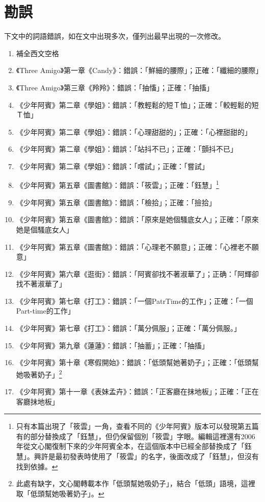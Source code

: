 \chapter*{勘誤}
下文中的詞語錯誤，如在文中出現多次，僅列出最早出現的一次修改。
\begin{enumerate}
\item 補全西文空格
\item 《Three Amigo》第一章《Candy》：錯誤：「鮮細的腰際」；正確：「纖細的腰際」
\item 《Three Amigo》第三章《羚羚》：錯誤：「抽慉」；正確：「抽搐」
\item 《少年阿賓》第二章《學姐》：錯誤：「教輕鬆的短Ｔ恤」；正確：「較輕鬆的短Ｔ恤」
\item 《少年阿賓》第二章《學姐》：錯誤：「心理甜甜的」；正確：「心裡甜甜的」
\item 《少年阿賓》第二章《學姐》：錯誤：「站抖不已」；正確：「顫抖不已」
\item 《少年阿賓》第二章《學姐》：錯誤：「嚐試」；正確：「嘗試」
\item 《少年阿賓》第五章《圖書館》：錯誤：「筱雲」；正確：「鈺慧」\footnote{只有本篇出現了「筱雲」一角，查看不同的《少年阿賓》版本可以發現第五篇有的部分替換成了「鈺慧」，但仍保留個別「筱雲」字眼。編輯這裡還有2006年從文心閣復制下來的少年阿賓全本，在這個版本中已經全部替換成了「鈺慧」。興許是最初發表時使用了「筱雲」的名字，後面改成了「鈺慧」，但沒有找到依據。}
\item 《少年阿賓》第五章《圖書館》：錯誤：「檢拾」；正確：「撿拾」
\item 《少年阿賓》第五章《圖書館》：錯誤：「原來是她個騷底女人」；正確：「原來她是個騷底女人」
\item 《少年阿賓》第五章《圖書館》：錯誤：「心理老不願意」；正確：「心裡老不願意」
\item 《少年阿賓》第六章《逛街》：錯誤：「阿賓卻找不著淑華了」；正确：「阿輝卻找不著淑華了」
\item 《少年阿賓》第七章《打工》：錯誤：「一個PatrTime的工作」；正確：「一個Part-time的工作」
\item 《少年阿賓》第七章《打工》：錯誤：「萬分佩服」；正確：「萬分佩服。」
\item 《少年阿賓》第九章《蓮蓮》：錯誤：「抽蓄」；正確：「抽搐」
\item 《少年阿賓》第十章《寒假開始》：錯誤：「低頭幫她著奶子」；正確：「低頭幫她吸著奶子」\footnote{此處有缺字，文心閣轉載本作「低頭幫她吸奶子」，結合「低頭」語境，這裡取「低頭幫她吸著奶子」。}
\item 《少年阿賓》第十一章《表妹孟卉》：錯誤：「正客廳在抹地板」；正確：「正在客廳抹地板」

\end{enumerate}
